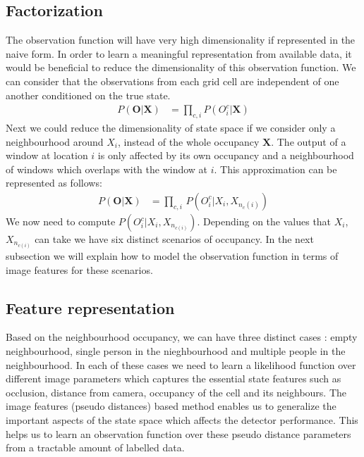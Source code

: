 \documentclass[10pt,twocolumn,letterpaper]{article}
\newcommand{\obs}{\mathbf{O}}
\newcommand{\state}{\mathbf{X}}
\begin{document}
\subsection{Factorization}

The observation function will have very high dimensionality if represented in the naive form. In order to learn a meaningful representation from available data, it would be beneficial to reduce the dimensionality of this observation function.
We can consider that the observations from each grid cell are independent of one another conditioned on the true state.
\begin{align}
P(\textbf{O}|\textbf{X})&=\prod_{c,i} {P(O_{i}^{c}|\textbf{X})}
\end{align}
Next we could reduce the dimensionality of state space if we consider only a neighbourhood around $ X_{i} $, instead of the whole occupancy $\textbf{X} $. The output of a window at location $ i $ is only affected by its own occupancy and a neighbourhood of windows which overlaps with the window at $ i$. This approximation can be represented as follows: 
\begin{align}
  P(\obs|\state) &= \prod_{c,i} \, P(O_{i}^{c}|X_{i},X_{n_{c}(i)})
\end{align}
We now need to compute  $ P(O_{i}^{c}|X_{i},X_{n_{c(i)}}) $. Depending on the values that $ X_{i} $, $ X_{n_{c(i)}} $ can take we have six distinct scenarios of occupancy. In the next subsection we will explain how to model the observation function in terms of image features for these scenarios.    \\

\subsection{Feature representation}
Based on the neighbourhood occupancy, we can have three distinct cases : empty neighbourhood, single person in the nieghbourhood and multiple people in the neighbourhood. In each of these cases we need to learn a likelihood function over different image parameters which captures the essential state features such as occlusion, distance from camera, occupancy of the cell and its neighbours. The image features (pseudo distances) based method enables us to generalize the important aspects of the state space which affects the detector performance. This helps us to learn an observation function over these pseudo distance parameters from a tractable amount of labelled data.
\end{document}
